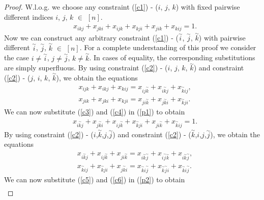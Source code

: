\begin{proof}
	W.l.o.g. we choose any constraint (\ref{c1}) - ($i$, $j$, $k$) with fixed pairwise different indices $i$, $j$, $k$ $\in$ $[n]$. 
	\begin{align}
	&x_{ikj} + x_{jki} + x_{ijk} + x_{kji} + x_{jik} + x_{kij} = 1. \label{p1}
	\end{align}
	Now we can construct any arbitrary constraint (\ref{c1}) - ($\overset{\sim}{i}$, $\overset{\sim}{j}$, $\overset{\sim}{k}$) with pairwise different $\overset{\sim}{i}$, $\overset{\sim}{j}$, $\overset{\sim}{k}$ $\in$ $[n]$. For a complete understanding of this proof we consider the case $i \neq \overset{\sim}{i}$, $j \neq \overset{\sim}{j}$, $k \neq \overset{\sim}{k}$. In cases of equality, the corresponding substitutions are simply superfluous. By using constraint (\ref{c2}) - ($i$, $j$, $k$, $\overset{\sim}{k}$) and constraint (\ref{c2}) - ($j$, $i$, $k$, $\overset{\sim}{k}$), we obtain the equations
	\begin{align}
	&x_{ijk} + x_{ikj} + x_{kij} = x_{ij\overset{\sim}{k}} + x_{i\overset{\sim}{k}j} + x_{\overset{\sim}{k}ij}, \label{c3}\\ 
	&x_{jik} + x_{jki} + x_{kji} = x_{ji\overset{\sim}{k}} + x_{j\overset{\sim}{k}i} + x_{\overset{\sim}{k}ji}.\label{c4}
	\end{align}
	We can now substitute (\ref{c3}) and (\ref{c4}) in (\ref{p1}) to obtain
	\begin{align}
	&x_{i\overset{\sim}{k}j} + x_{j\overset{\sim}{k}i} + x_{ij\overset{\sim}{k}} + x_{\overset{\sim}{k}ji} + x_{ji\overset{\sim}{k}} + x_{\overset{\sim}{k}ij} = 1. \label{p2}
	\end{align}
	\newpage
	By using constraint (\ref{c2}) - ($i$,$\overset{\sim}{k}$,$j$,$\overset{\sim}{j}$) and constraint (\ref{c2}) - ($\overset{\sim}{k}$,$i$,$j$,$\overset{\sim}{j}$), we obtain the equations
	\begin{align}
	&x_{i\overset{\sim}{k}j} + x_{ij\overset{\sim}{k}} + x_{ji\overset{\sim}{k}} = x_{i\overset{\sim}{k}\overset{\sim}{j}} + x_{i\overset{\sim}{j}\overset{\sim}{k}} + x_{i\overset{\sim}{k}\overset{\sim}{j}},  \label{c5}\\ 
	&x_{\overset{\sim}{k}ij} + x_{\overset{\sim}{k}ji} + x_{j\overset{\sim}{k}i} = x_{\overset{\sim}{k}i\overset{\sim}{j}} + x_{\overset{\sim}{k}\overset{\sim}{j}i} + x_{\overset{\sim}{k}i\overset{\sim}{j}}.  \label{c6}
	\end{align}
	We can now substitute (\ref{c5}) and (\ref{c6}) in (\ref{p2}) to obtain
	\begin{align}

\end{align}
\end{proof}
